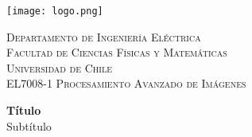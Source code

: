 \documentclass[letterpaper,11pt]{article}
\begin{document}
	\noindent
	\begin{minipage}{0.3\textwidth}
		\texttt{[image: logo.png]} 
	\end{minipage}
	\begin{minipage}{0.65\textwidth}
		\vspace{0.6cm}  %
		\raggedright
		\textsc{\color{red}Departamento de Ingeniería Eléctrica}\\
		\textsc{\color{gray51}Facultad de Ciencias Físicas y Matemáticas}\\
		\textsc{\color{gray51}Universidad de Chile}\\
		\textsc{\color{gray51}EL7008-1 Procesamiento Avanzado de Imágenes}
	\end{minipage}
	
	\vspace{0cm}  %
	
	\begin{center}
		{\LARGE \textbf{Título}}\\
		{\Large Subtítulo}
	\end{center}
	
	
	\printbibliography
	
\end{document}
